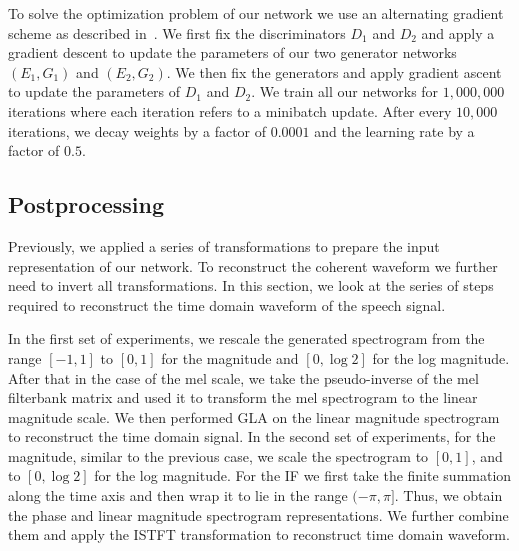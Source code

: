 To solve the optimization problem of our network we use an alternating gradient scheme as described in~\cite{goodfellow2014generative}. We first fix the discriminators $D_1$ and $D_2$ and apply a gradient descent to update the parameters of our two generator networks $(E_1,G_1)$ and $(E_2, G_2)$. We then fix the generators and apply gradient ascent to update the parameters of $D_1$ and $D_2$. We train all our networks for $1,000,000$ iterations where each iteration refers to a minibatch update. After every $10,000$ iterations, we decay weights by a factor of $0.0001$ and the learning rate by a factor of $0.5$. 

\subsection{Postprocessing}
\label{subsec:post_process_network}

Previously, we applied a series of transformations to prepare the input representation of our network. To reconstruct the coherent waveform we further need to invert all transformations. In this section, we look at the series of steps required to reconstruct the time domain waveform of the speech signal.

In the first set of experiments, we rescale the generated spectrogram from the range $[-1,1]$ to $[0,1]$ for the magnitude and $[0,\log 2]$ for the log magnitude. After that in the case of the mel scale, we take the pseudo-inverse of the mel filterbank matrix and used it to transform the mel spectrogram to the linear magnitude scale. We then performed GLA on the linear magnitude spectrogram to reconstruct the time domain signal. In the second set of experiments, for the magnitude, similar to the previous case, we scale the spectrogram to $[0,1]$, and to $[0,\log 2]$ for the log magnitude. For the IF we first take the finite summation along the time axis and then wrap it to lie in the range $(-\pi, \pi]$. Thus, we obtain the phase and linear magnitude spectrogram representations. We further combine them and apply the ISTFT transformation to reconstruct time domain waveform. 


